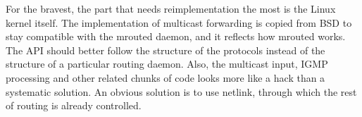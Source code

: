For the bravest, the part that needs reimplementation the most is the Linux
kernel itself. The implementation of multicast forwarding is copied from BSD to
stay compatible with the mrouted daemon, and it reflects how mrouted works.
The API should better follow the structure of the protocols instead of the
structure of a particular routing daemon. Also, the multicast input, IGMP
processing and other related chunks of code looks more like a hack than
a systematic solution. An obvious solution is to use netlink, through which the
rest of routing is already controlled.
